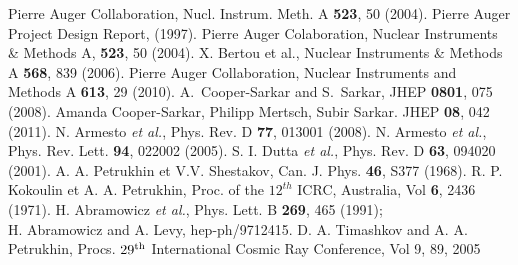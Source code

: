 \begin{thebibliography}{1}
 Pierre Auger Collaboration, Nucl. Instrum. Meth. A \textbf{523}, 50 (2004).
 Pierre Auger Project Design Report, (1997).
 Pierre Auger Colaboration, Nuclear Instruments \& Methods A, \textbf{523}, 50 (2004).
  X. Bertou et al., Nuclear Instruments \& Methods A \textbf{568}, 839 (2006).
 Pierre Auger Collaboration, Nuclear Instruments and Methods A \textbf{613}, 29 (2010).
 A.~Cooper-Sarkar and S.~Sarkar, JHEP {\bf 0801}, 075 (2008).
Amanda Cooper-Sarkar, Philipp Mertsch, Subir Sarkar. JHEP \textbf{08}, 042 (2011).
 N. Armesto {\it et al.}, Phys. Rev. D \textbf{77}, 013001 (2008).
 N. Armesto {\it et al.}, Phys. Rev. Lett. \textbf{94}, 022002 (2005).
 S. I. Dutta {\it et al.}, Phys. Rev. D \textbf{63}, 094020 (2001).
 A. A. Petrukhin et V.V. Shestakov, Can. J. Phys. \textbf{46}, S377 (1968).
 R. P. Kokoulin et A. A. Petrukhin, Proc. of the $12^{th}$ ICRC, Australia, Vol \textbf{6}, 2436 (1971).
 H. Abramowicz {\it et al.}, Phys. Lett. B \textbf{269}, 465  (1991);\\ 
H. Abramowicz and A. Levy, hep-ph/9712415.
 D. A. Timashkov and A. A. Petrukhin, Procs. $29^{\rm th}$ International Cosmic Ray Conference, Vol 9, 89, 2005


\end{thebibliography}
